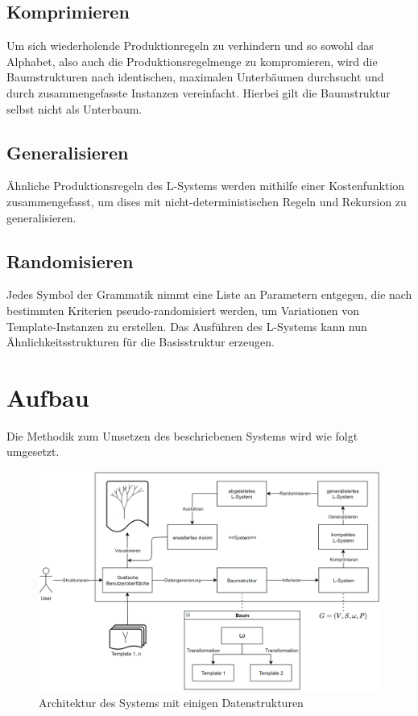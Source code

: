 \subsection*{Komprimieren}
Um sich wiederholende Produktionregeln zu verhindern und so sowohl das Alphabet, also auch die Produktionsregelmenge
zu kompromieren, wird die Baumstrukturen nach identischen, maximalen Unterbäumen durchsucht und durch zusammengefasste
Instanzen vereinfacht.
Hierbei gilt die Baumstruktur selbst nicht als Unterbaum.

\subsection*{Generalisieren}
Ähnliche Produktionsregeln des L-Systems werden mithilfe einer Kostenfunktion zusammengefasst, um dises mit
nicht-deterministischen Regeln und Rekursion zu generalisieren.

\subsection*{Randomisieren}
Jedes Symbol der Grammatik nimmt eine Liste an Parametern entgegen, die nach bestimmten Kriterien pseudo-randomisiert
werden, um Variationen von Template-Instanzen zu erstellen.
Das Ausführen des L-Systems kann nun Ähnlichkeitsstrukturen für die Basisstruktur erzeugen.

\section{Aufbau}

Die Methodik zum Umsetzen des beschriebenen Systems wird wie folgt umgesetzt.

\begin{figure}[H]
    \centering
    \includegraphics[width=14cm]{../images/System.PNG}
    \caption[Systemarchitektur]{Architektur des Systems mit einigen Datenstrukturen}
\end{figure}

